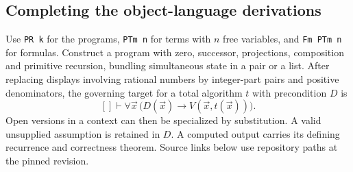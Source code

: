 \subsection{Completing the object-language derivations}
Use \texttt{PR k} for the programs, \texttt{PTm n} for terms with $n$ free variables, and \texttt{Fm PTm n} for formulas. Construct a program with zero, successor, projections, composition and primitive recursion, bundling simultaneous state in a pair or a list. After replacing displays involving rational numbers by integer-part pairs and positive denominators, the governing target for a total algorithm $t$ with precondition $D$ is
\[
 []\vdash \forall\vec x\,\big(D(\vec x)\longrightarrow
                   V(\vec x,t(\vec x))\big).
\]
Open versions in a context can then be specialized by substitution. A valid unsupplied assumption is retained in $D$. A computed output carries its defining recurrence and correctness theorem. Source links below use repository paths at the pinned revision.

